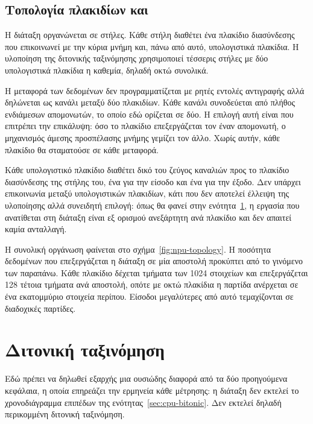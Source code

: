 \subsection{Τοπολογία πλακιδίων και }
\label{sec:npu-objectfifo}

Η διάταξη οργανώνεται σε στήλες. Κάθε στήλη διαθέτει ένα πλακίδιο διασύνδεσης
που επικοινωνεί με την κύρια μνήμη και, πάνω από αυτό, υπολογιστικά πλακίδια. Η
υλοποίηση της διτονικής ταξινόμησης χρησιμοποιεί τέσσερις στήλες με δύο
υπολογιστικά πλακίδια η καθεμία, δηλαδή οκτώ συνολικά.

Η μεταφορά των δεδομένων δεν προγραμματίζεται με ρητές εντολές αντιγραφής αλλά
δηλώνεται ως κανάλι μεταξύ δύο πλακιδίων. Κάθε κανάλι συνοδεύεται από πλήθος
ενδιάμεσων απομονωτών, το οποίο εδώ ορίζεται σε δύο. Η επιλογή αυτή είναι που
επιτρέπει την επικάλυψη: όσο το πλακίδιο επεξεργάζεται τον έναν απομονωτή, ο
μηχανισμός άμεσης προσπέλασης μνήμης γεμίζει τον άλλο. Χωρίς αυτήν, κάθε
πλακίδιο θα σταματούσε σε κάθε μεταφορά.

Κάθε υπολογιστικό πλακίδιο διαθέτει δικό του ζεύγος καναλιών προς το πλακίδιο
διασύνδεσης της στήλης του, ένα για την είσοδο και ένα για την έξοδο. Δεν
υπάρχει επικοινωνία μεταξύ υπολογιστικών πλακιδίων, κάτι που δεν αποτελεί
έλλειψη της υλοποίησης αλλά συνειδητή επιλογή: όπως θα φανεί στην
ενότητα~\ref{sec:npu-bitonic}, η εργασία που ανατίθεται στη διάταξη είναι εξ
ορισμού ανεξάρτητη ανά πλακίδιο και δεν απαιτεί καμία ανταλλαγή.

Η συνολική οργάνωση φαίνεται στο σχήμα~\ref{fig:npu-topology}. Η ποσότητα
δεδομένων που επεξεργάζεται η διάταξη σε μία αποστολή προκύπτει από
το γινόμενο των παραπάνω. Κάθε πλακίδιο δέχεται τμήματα των 1024 στοιχείων και
επεξεργάζεται 128 τέτοια τμήματα ανά αποστολή, οπότε με οκτώ πλακίδια η
παρτίδα ανέρχεται σε ένα εκατομμύριο στοιχεία περίπου. Είσοδοι μεγαλύτερες από
αυτό τεμαχίζονται σε διαδοχικές παρτίδες.



\section{Διτονική ταξινόμηση}
\label{sec:npu-bitonic}

Εδώ πρέπει να δηλωθεί εξαρχής μια ουσιώδης διαφορά από τα δύο προηγούμενα
κεφάλαια, η οποία επηρεάζει την ερμηνεία κάθε μέτρησης: η διάταξη δεν εκτελεί
το χρονοδιάγραμμα επιπέδων της ενότητας~\ref{sec:cpu-bitonic}. Δεν εκτελεί
δηλαδή περικομμένη διτονική ταξινόμηση.

